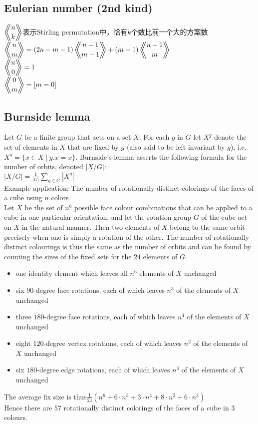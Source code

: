 	\subsection*{Eulerian number (2nd kind)}
		$ \Eularian{n}{k} $表示Stirling permutation中，恰有$ k $个数比前一个大的方案数
		\\$ \Eularian{n}{m} = (2n - m - 1) \Eularian{n - 1}{m - 1} + (m + 1) \Eularian{n - 1}{m} $
		\\$ \Eularian{n}{0} = 1 $
		\\$ \Eularian{0}{m} = [m = 0] $
	\subsection*{Burnside lemma}
		Let $ G $ be a finite group that acts on a set $ X $. For each $ g $ in $ G $ let $ X^g $ denote the set of elements in $ X $ that are fixed by $ g $ (also said to be left invariant by $ g $), i.e. $ X^g = \lbrace x \in X \mid g.x = x \rbrace $. Burnside's lemma asserts the following formula for the number of orbits, denoted $ \left| X / G \right| $:
		\\$ \left| X / G \right| = \frac{1}{\left| G \right|} \sum\limits_{g \in G}^{} \left| X^g \right| $
		\\Example application: The number of rotationally distinct colorings of the faces of a cube using $ n $ colors
		\\Let $ X $ be the set of $ n^6 $ possible face colour combinations that can be applied to a cube in one particular orientation, and let the rotation group $ G $ of the cube act on $ X $ in the natural manner. Then two elements of $ X $ belong to the same orbit precisely when one is simply a rotation of the other. The number of rotationally distinct colourings is thus the same as the number of orbits and can be found by counting the sizes of the fixed sets for the $ 24 $ elements of $ G $.
		\begin{itemize}[nosep]
			\item one identity element which leaves all $ n^6 $ elements of $ X $ unchanged
			\item six $ 90 $-degree face rotations, each of which leaves $ n^3 $ of the elements of $ X $ unchanged
			\item three $ 180 $-degree face rotations, each of which leaves $ n^4 $ of the elements of $ X $ unchanged
			\item eight $ 120 $-degree vertex rotations, each of which leaves $ n^2 $ of the elements of $ X $ unchanged
			\item six $ 180 $-degree edge rotations, each of which leaves $ n^3 $ of the elements of $ X $ unchanged
		\end{itemize}
		The average fix size is thus$ \frac {1}{24}(n^6+6\cdot n^3+3\cdot n^4+8\cdot n^2+6\cdot n^3) $
		\\Hence there are $ 57 $ rotationally distinct colorings of the faces of a cube in $ 3 $ colours.
